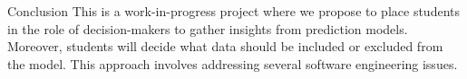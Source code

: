 \begin{frame}{Conclusion}
    This is a work-in-progress project where we propose to place students in the role of 
    decision-makers to gather insights from prediction models. 
    Moreover, students will decide what data should be included or excluded from the model. 
    This approach involves addressing several software engineering issues.
    \pause

\end{frame}

